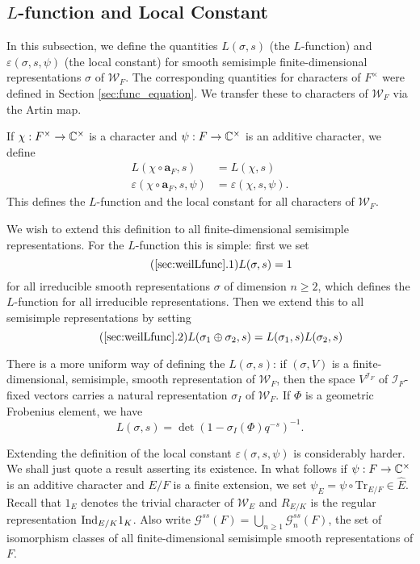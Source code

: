 \subsection{\texorpdfstring{$L$}{TEXT}-function and Local Constant}\label{sec:weilLfunc}
In this subsection, we define the quantities $L(\sigma, s)$ (the $L$-function) and $\varepsilon(\sigma, s, \psi)$ (the local constant) for smooth semisimple finite-dimensional representations $\sigma$ of $\mathcal{W}_F$. The corresponding quantities for characters of $F^\times$ were defined in Section \ref{sec:func_equation}. We transfer these to characters of $\mathcal{W}_F$ via the Artin map.
\begin{defn}\label{defn:LfuncWeil}
	If $\chi: F^\times \to \mathbb{C}^\times$ is a character and $\psi: F\to \mathbb{C}^\times$ is an additive character, we define
	\begin{align*}
		L(\chi\circ\mathbf{a}_F, s) &= L(\chi, s)\\
		\varepsilon(\chi\circ\mathbf{a}_F, s, \psi) &= \varepsilon(\chi, s, \psi).
	\end{align*}
	This defines the $L$-function and the local constant for all characters of $\mathcal{W}_F$.
\end{defn}
We wish to extend this definition to all finite-dimensional semisimple representations. For the $L$-function this is simple: first we set
\begin{equation}\label{eqn:Lweilirrep}\tag{\ref{sec:weilLfunc}.1}
	L(\sigma, s) = 1
\end{equation}
for all irreducible smooth representations $\sigma$ of dimension $n\ge 2$, which defines the $L$-function for all irreducible representations. Then we extend this to all semisimple representations by setting
\begin{equation}\label{eqn:Lweilsum}\tag{\ref{sec:weilLfunc}.2}
	L(\sigma_1\oplus \sigma_2, s) = L(\sigma_1, s)L(\sigma_2, s)
\end{equation}
\begin{rem}
	There is a more uniform way of defining the $L(\sigma, s)$: if $(\sigma, V)$ is a finite-dimensional, semisimple, smooth representation of $\mathcal{W}_F$, then the space $V^{\mathcal{I}_F}$ of $\mathcal{I}_F$-fixed vectors carries a natural representation $\sigma_{I}$ of $\mathcal{W}_F$. If $\Phi$ is a geometric Frobenius element, we have
	\[L(\sigma, s) = \det(1 - \sigma_I(\Phi)q^{-s})^{-1}.\] 
\end{rem}
Extending the definition of the local constant $\varepsilon(\sigma, s, \psi)$ is considerably harder. We shall just quote a result asserting its existence. In what follows if $\psi: F\to \mathbb{C}^\times$ is an additive character and $E/F$ is a finite extension, we set $\psi_E = \psi \circ \mathrm{Tr}_{E/F}\in \widehat{E}$. Recall that $1_E$ denotes the trivial character of $\mathcal{W}_E$ and $R_{E/K}$ is the regular representation $\mathrm{Ind}_{E/K} 1_K$. Also write $\mathcal{G}^{ss}(F) = \bigcup_{n\ge 1} \mathcal{G}^{ss}_n(F)$, the set of isomorphism classes of all finite-dimensional semisimple smooth representations of $F$.
